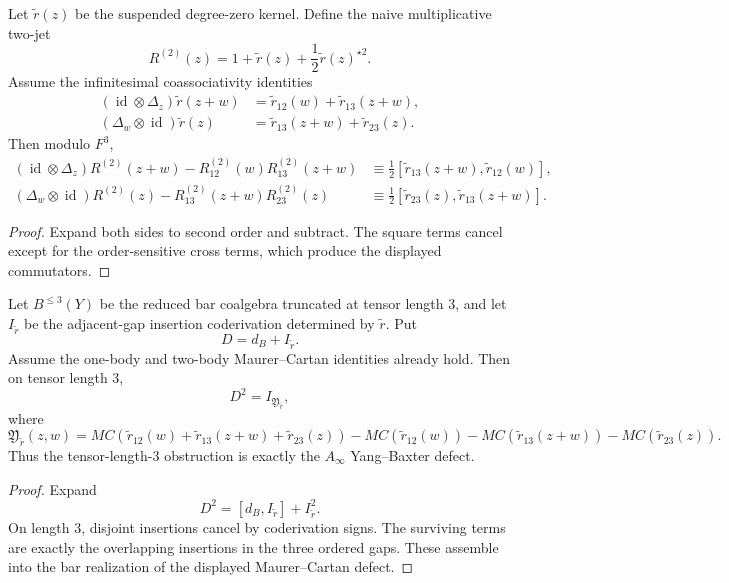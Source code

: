 \begin{proposition}
\ClaimStatusProvedHere
Let $\widetilde r(z)$ be the suspended degree-zero kernel.  Define the
naive multiplicative two-jet
\[
R^{(2)}(z)=1+\widetilde r(z)+\frac12\widetilde r(z)^{\star 2}.
\]
Assume the infinitesimal coassociativity identities
\begin{align*}
(\operatorname{id}\otimes \Delta_z)\widetilde r(z+w)
&=\widetilde r_{12}(w)+\widetilde r_{13}(z+w),\\
(\Delta_w\otimes \operatorname{id})\widetilde r(z)
&=\widetilde r_{13}(z+w)+\widetilde r_{23}(z).
\end{align*}
Then modulo $F^3$,
\begin{align*}
(\operatorname{id}\otimes \Delta_z)R^{(2)}(z+w)-R^{(2)}_{12}(w)R^{(2)}_{13}(z+w)
&\equiv \frac12[\widetilde r_{13}(z+w),\widetilde r_{12}(w)],\\
(\Delta_w\otimes \operatorname{id})R^{(2)}(z)-R^{(2)}_{13}(z+w)R^{(2)}_{23}(z)
&\equiv \frac12[\widetilde r_{23}(z),\widetilde r_{13}(z+w)].
\end{align*}
\end{proposition}

\begin{proof}
Expand both sides to second order and subtract.  The square terms cancel
except for the order-sensitive cross terms, which produce the displayed
commutators.
\end{proof}

\begin{proposition}
\ClaimStatusProvedHere
Let $B^{\le 3}(Y)$ be the reduced bar coalgebra truncated at tensor
length $3$, and let $I_{\widetilde r}$ be the adjacent-gap insertion
coderivation determined by $\widetilde r$.  Put
\[
D=d_B+I_{\widetilde r}.
\]
Assume the one-body and two-body Maurer--Cartan identities already
hold.  Then on tensor length $3$,
\[
D^2=I_{\mathfrak Y_{\widetilde r}},
\]
where
\[
\mathfrak Y_{\widetilde r}(z,w)=
MC(\widetilde r_{12}(w)+\widetilde r_{13}(z+w)+\widetilde r_{23}(z))
-MC(\widetilde r_{12}(w))
-MC(\widetilde r_{13}(z+w))
-MC(\widetilde r_{23}(z)).
\]
Thus the tensor-length-$3$ obstruction is exactly the
$A_\infty$ Yang--Baxter defect.
\end{proposition}

\begin{proof}
Expand
\[
D^2=[d_B,I_{\widetilde r}] + I_{\widetilde r}^2.
\]
On length $3$, disjoint insertions cancel by coderivation signs.
The surviving terms are exactly the overlapping insertions in the three
ordered gaps.  These assemble into the bar realization of the displayed
Maurer--Cartan defect.
\end{proof}

